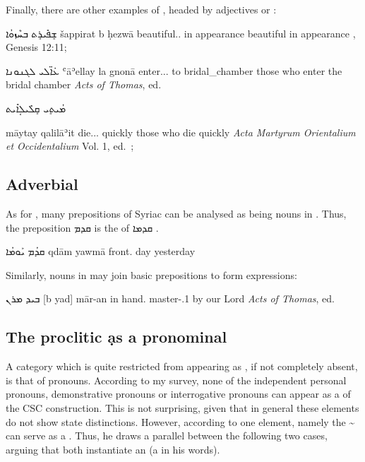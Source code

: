 {Finally, there are other examples of  \secns, headed by adjectives or :


{ܫܱܦܺܝܪܱܬ ܒܚܶܙܘܳܐ}
{šappirat b\cb{} ḥezwā}
{beautiful.\fpl.\cst{} in\cb{} appearance}
{beautiful in appearance}
{\Pesh, Genesis 12:11; \cite[158, \S 206]{NoldekeSyriac}}



{ܥ̇ܐ̈ܠܝ ܠܓܢܘܢܐ}
{ʿāʾellay la\cb{} gnonā}
{enter.\ptcp.\mpl.\cst{} to\cb{} bridal\_chamber}
{those who enter the bridal chamber}
{\textit{Acts of Thomas}, ed.\ \cite[]{WrightActs}}


{ܡܳܝܬܱܝ ܩܱܠܺܝܠܴܐܺܝܬ}
{māytay qalilāʾit
{die.\ptcp.\mpl.\cst{} quickly}
{those who die quickly}
{\textit{Acta Martyrum Orientalium et Occidentalium} Vol. 1, ed.\ \cite[79, 10]{AssemanusActa}; \cite[157, \S 207]{NoldekeSyriac}}


\subsection{Adverbial \prims}

As for  \prims, many prepositions of Syriac can be analysed as being  nouns in \cst*. Thus, the preposition \textsyriac{ܩܕܡ}  is the \cst* of \textsyriac{ܩܕܡܐ} .

{ܩܕܳܡ ܝܰܘܡܳܐ}
{qdām yawmā}
{front.\cst{} day}
{yesterday}
{\cite[490]{CSD}}

Similarly, nouns in \cst* may join basic prepositions to form  expressions:

{ܒܝܕ ܡܪܢ}
{[b\cb{} yad] mār-an}
{in\cb{} hand.\cst{} master-\poss.1\pl}
{by our Lord}
{\textit{Acts of Thomas}, ed.\ \cite[]{WrightActs}}


\subsection{The proclitic \d as a pronominal \prim}

A category which is quite restricted from appearing as \prim, if not completely absent, is that of pronouns. According to my survey, none of the independent personal pronouns, demonstrative pronouns or interrogative pronouns can appear as a \prim of the CSC construction. This is not surprising, given that in general these elements do not show state distinctions. However, according to \citet{GoldenbergAttribution} one element, namely the  \~ can serve as a . Thus, he draws a parallel between the following two cases, arguing that both instantiate an  (a  in his words). 

}}
